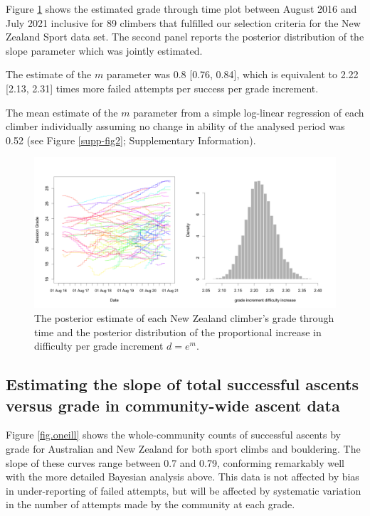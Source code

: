 \documentclass{article}
\begin{document}
Figure \ref{nz_ascents} shows the estimated grade through time plot between August 2016 and July 2021 inclusive for 89 climbers that fulfilled our selection criteria for the New Zealand Sport data set. The second panel reports the posterior distribution of the slope parameter which was jointly estimated.

The estimate of the $m$ parameter was 0.8 [0.76, 0.84], which is equivalent to 2.22 [2.13, 2.31] times more failed attempts per success per grade increment. 

The mean estimate of the $m$ parameter from a simple log-linear regression of each climber individually assuming no change in ability of the analysed period was 0.52 (see Figure \ref{supp-fig2}; Supplementary Information). 


\begin{figure}
\centering
\includegraphics[width=\textwidth]{../results/nz/ascents-from-2016-08-01-to-2021-08-01-minAscents30-minFails1-Sport-AU-session-posterior.png}
\caption{\small The posterior estimate of each New Zealand climber's grade through time and the posterior distribution of the proportional increase in difficulty per grade increment $d = e^m$.}
\label{nz_ascents}
\end{figure}


\subsection*{Estimating the slope of total successful ascents versus grade in community-wide ascent data}

Figure \ref{fig.oneill} shows the whole-community counts of successful ascents by grade for Australian and New Zealand for both sport climbs and bouldering. The slope of these curves range between 0.7 and 0.79, conforming remarkably well with the more detailed Bayesian analysis above. This data is not affected by bias in under-reporting of failed attempts, but will be affected by systematic variation in the number of attempts made by the community at each grade.
\end{document}
